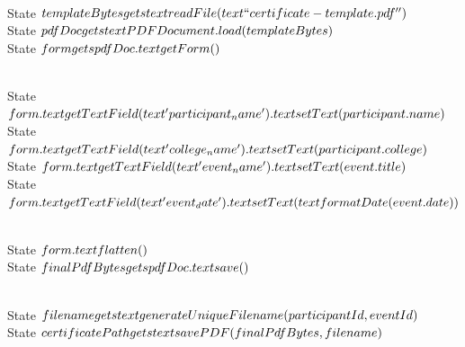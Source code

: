     \\State $templateBytes \\gets \\text{readFile}(\\text{``certificate-template.pdf''})$
    \\State $pdfDoc \\gets \\text{PDFDocument.load}(templateBytes)$
    \\State $form \\gets pdfDoc.\\text{getForm}()$
    
    \\State $form.\\text{getTextField}(\\text{'participant\\_name'}).\\text{setText}(participant.name)$
    \\State $form.\\text{getTextField}(\\text{'college\\_name'}).\\text{setText}(participant.college)$
    \\State $form.\\text{getTextField}(\\text{'event\\_name'}).\\text{setText}(event.title)$
    \\State $form.\\text{getTextField}(\\text{'event\\_date'}).\\text{setText}(\\text{formatDate}(event.date))$
    
    \\State $form.\\text{flatten}()$
    \\State $finalPdfBytes \\gets pdfDoc.\\text{save}()$
    
    \\State $filename \\gets \\text{generateUniqueFilename}(participantId, eventId)$
    \\State $certificatePath \\gets \\text{savePDF}(finalPdfBytes, filename)$
    
